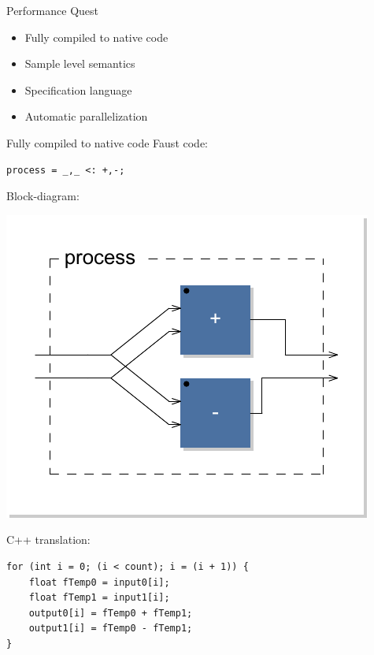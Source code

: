 
\begin{frame}[fragile]{Performance Quest}
	\begin{itemize}
		\item Fully compiled to native code
        \item Sample level semantics
        \item Specification language
        \item Automatic parallelization
    \end{itemize}
\end{frame}



\begin{frame}[fragile]{Fully compiled to native code}
Faust code:
\begin{lstlisting}
process = _,_ <: +,-;
\end{lstlisting}

Block-diagram:
\begin{center}
    \includegraphics[scale=0.4]{images/expaw}
\end{center}

C++ translation:
\begin{lstlisting}
for (int i = 0; (i < count); i = (i + 1)) {
    float fTemp0 = input0[i];
    float fTemp1 = input1[i];
    output0[i] = fTemp0 + fTemp1;
    output1[i] = fTemp0 - fTemp1;
}
\end{lstlisting}

\end{frame}



